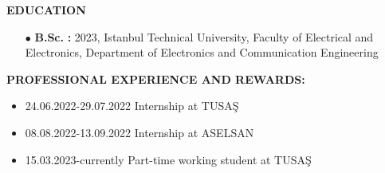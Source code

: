 \renewcommand\labelitemi{\normalsize$\bullet$} 			%

\textbf{EDUCATION\makebox[2.41cm]{\hfill \textbf{:}}}  	%
\vspace{-3mm}

\begin{itemize}[leftmargin=5.15cm,itemsep=-0.25em,labelsep=2mm] %
	\item [$\bullet$ \hspace{1em}\textbf{B.Sc.} \hspace{6.85em} \textbf{:}] 2023, Istanbul Technical University, Faculty of Electrical and Electronics, Department of Electronics and Communication Engineering
\end{itemize}

\textbf{PROFESSIONAL EXPERIENCE AND REWARDS:}   
\vspace{-3mm}
\begin{itemize}[leftmargin=0.7cm,itemsep=-0.25em,labelsep=5mm] %
	\item 24.06.2022-29.07.2022 Internship at TUSAŞ
	\item 08.08.2022-13.09.2022 Internship at ASELSAN
	\item 15.03.2023-currently Part-time working student at TUSAŞ
\end{itemize}

	
